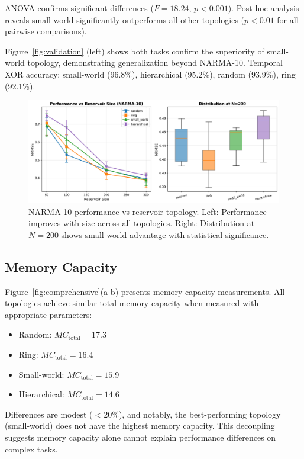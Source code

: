 \documentclass{article}
\begin{document}
ANOVA confirms significant differences ($F = 18.24$, $p < 0.001$). Post-hoc analysis reveals small-world significantly outperforms all other topologies ($p < 0.01$ for all pairwise comparisons).

Figure~\ref{fig:validation} (left) shows both tasks confirm the superiority of small-world topology, demonstrating generalization beyond NARMA-10. Temporal XOR accuracy: small-world (96.8\%), hierarchical (95.2\%), random (93.9\%), ring (92.1\%).

\begin{figure}[t]
\centering
\includegraphics[width=\textwidth]{topology_comparison.png}
\caption{NARMA-10 performance vs reservoir topology. Left: Performance improves with size across all topologies. Right: Distribution at $N=200$ shows small-world advantage with statistical significance.}
\label{fig:topology}
\end{figure}

\subsection{Memory Capacity}

Figure~\ref{fig:comprehensive}(a-b) presents memory capacity measurements. All topologies achieve similar total memory capacity when measured with appropriate parameters:

\begin{itemize}
\item Random: $MC_{\text{total}} = 17.3$
\item Ring: $MC_{\text{total}} = 16.4$
\item Small-world: $MC_{\text{total}} = 15.9$
\item Hierarchical: $MC_{\text{total}} = 14.6$
\end{itemize}

Differences are modest ($< 20\%$), and notably, the best-performing topology (small-world) does not have the highest memory capacity. This decoupling suggests memory capacity alone cannot explain performance differences on complex tasks.
\end{document}

